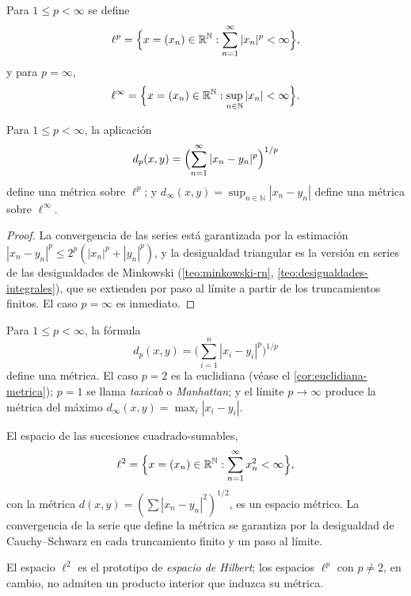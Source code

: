 \begin{definition}
\label{def:spaces-ellp}
Para $1\leq p<\infty$ se define
\[
  \ell^p=\Bigl\{x=(x_n)\in\mathbb{R}^{\mathbb{N}}:\sum_{n=1}^{\infty}|x_n|^p<\infty\Bigr\},
\]
y para $p=\infty$,
\[
  \ell^{\infty}=\Bigl\{x=(x_n)\in\mathbb{R}^{\mathbb{N}}:\sup_{n\in\mathbb{N}}|x_n|<\infty\Bigr\}.
\]
\end{definition}

\begin{proposition}
\label{prop:metricas-sucesiones}
Para $1\leq p<\infty$, la aplicación
\[
  d_p(x,y)=\Bigl(\sum_{n=1}^{\infty}|x_n-y_n|^p\Bigr)^{1/p}
\]
define una métrica sobre $\ell^p$; y $d_\infty(x,y)=\sup_{n\in\mathbb{N}}|x_n-y_n|$ define una métrica sobre $\ell^{\infty}$.
\end{proposition}
\begin{proof}
La convergencia de las series está garantizada por la estimación $|x_n-y_n|^p\leq 2^p(|x_n|^p+|y_n|^p)$, y la desigualdad triangular es la versión en series de las desigualdades de Minkowski (\cref{teo:minkowski-rn}, \cref{teo:desigualdades-integrales}), que se extienden por paso al límite a partir de los truncamientos finitos. El caso $p=\infty$ es inmediato.
\end{proof}

\begin{example}
\label{ej:lp}
Para $1\leq p<\infty$, la fórmula
\[
  d_p(x,y)=\biggl(\sum_{i=1}^{n}|x_i-y_i|^p\biggr)^{1/p}
\]
define una métrica. El caso $p=2$ es la euclidiana (véase el \cref{cor:euclidiana-metrica}); $p=1$ se llama \emph{taxicab} o \emph{Manhattan}; y el límite $p\to\infty$ produce la métrica del máximo $d_\infty(x,y)=\max_i|x_i-y_i|$.
\end{example}

\begin{example}
\label{ej:hilbert}
El espacio de las sucesiones cuadrado-sumables,
\[
  \ell^2=\Bigl\{x=(x_n)\in\mathbb{R}^{\mathbb{N}}:\sum_{n=1}^{\infty}x_n^2<\infty\Bigr\},
\]
con la métrica $d(x,y)=(\sum|x_n-y_n|^2)^{1/2}$, es un espacio métrico. La convergencia de la serie que define la métrica se garantiza por la desigualdad de Cauchy--Schwarz en cada truncamiento finito y un paso al límite.
\end{example}

El espacio $\ell^2$ es el prototipo de \emph{espacio de Hilbert}; los espacios $\ell^p$ con $p\neq 2$, en cambio, no admiten un producto interior que induzca su métrica.

